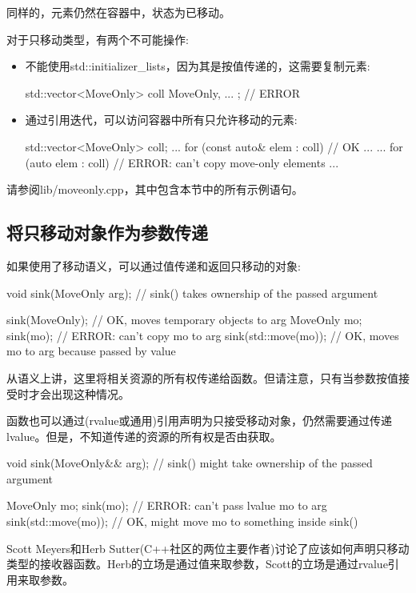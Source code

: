 同样的，元素仍然在容器中，状态为已移动。

对于只移动类型，有两个不可能操作:

\begin{itemize}
\item 不能使用std::initializer_lists，因为其是按值传递的，这需要复制元素:
\begin{cppcode}
std::vector<MoveOnly> coll{ MoveOnly{}, ... }; // ERROR
\end{cppcode}
\item 通过引用迭代，可以访问容器中所有只允许移动的元素:
\begin{cppcode}
std::vector<MoveOnly> coll;
...
for (const auto& elem : coll) { // OK
	...
}
...
for (auto elem : coll) { // ERROR: can’t copy move-only elements
	...
}
\end{cppcode}
\end{itemize}

请参阅lib/moveonly.cpp，其中包含本节中的所有示例语句。

\subsection{将只移动对象作为参数传递}

如果使用了移动语义，可以通过值传递和返回只移动的对象:

\begin{cppcode}
void sink(MoveOnly arg); // sink() takes ownership of the passed argument

sink(MoveOnly{}); // OK, moves temporary objects to arg
MoveOnly mo;
sink(mo); // ERROR: can’t copy mo to arg
sink(std::move(mo)); // OK, moves mo to arg because passed by value
\end{cppcode}

从语义上讲，这里将相关资源的所有权传递给函数。但请注意，只有当参数按值接受时才会出现这种情况。

函数也可以通过(rvalue或通用)引用声明为只接受移动对象，仍然需要通过传递lvalue。但是，不知道传递的资源的所有权是否由获取。

\begin{cppcode}
void sink(MoveOnly&& arg); // sink() might take ownership of the passed argument

MoveOnly mo;
sink(mo); // ERROR: can’t pass lvalue mo to arg
sink(std::move(mo)); // OK, might move mo to something inside sink()
\end{cppcode}

Scott Meyers和Herb Sutter(C++社区的两位主要作者)讨论了应该如何声明只移动类型的接收器函数。Herb的立场是通过值来取参数，Scott的立场是通过rvalue引用来取参数。

